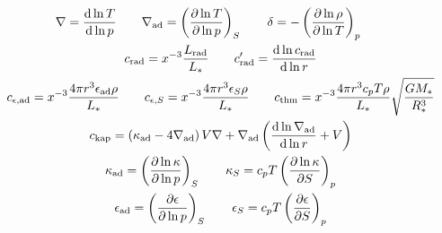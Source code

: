 \documentclass[fleqn]{article}
\newcommand{\diff}{\ensuremath{\mathrm{d}}}
\newcommand{\nabad}{\ensuremath{\nabla_{\rm ad}}}
\newcommand{\kapad}{\ensuremath{\kappa_{\rm ad}}}
\newcommand{\kapS}{\ensuremath{\kappa_{S}}}
\newcommand{\epsad}{\ensuremath{\epsilon_{\rm ad}}}
\newcommand{\epsS}{\ensuremath{\epsilon_{S}}}
\newcommand{\crad}{\ensuremath{c_{\rm rad}}}
\newcommand{\cepsad}{\ensuremath{c_{\epsilon,{\rm ad}}}}
\newcommand{\cepsS}{\ensuremath{c_{\epsilon,S}}}
\newcommand{\cthm}{\ensuremath{c_{\rm thm}}}
\newcommand{\ckap}{\ensuremath{c_{\rm kap}}}
\newcommand{\Rstar}{\ensuremath{R_{\ast}}}
\newcommand{\Mstar}{\ensuremath{M_{\ast}}}
\newcommand{\Lrad}{\ensuremath{L_{\rm rad}}}
\newcommand{\Lstar}{\ensuremath{L_{\ast}}}
\begin{document}
\begin{gather*}
\nabla = \frac{\diff \ln T}{\diff \ln p} \qquad
\nabad = \left( \frac{\partial \ln T}{\partial \ln p} \right)_{S} \qquad
\delta = - \left( \frac{\partial \ln \rho}{\partial \ln T} \right)_{p} \qquad \\
\crad = x^{-3} \frac{\Lrad}{\Lstar} \qquad
\crad' = \frac{\diff \ln \crad}{\diff \ln r} \\
\cepsad = x^{-3} \frac{4\pi r^{3} \epsad \rho}{\Lstar} \qquad
\cepsS = x^{-3} \frac{4\pi r^{3} \epsS \rho}{\Lstar} \qquad
\cthm = x^{-3} \frac{4\pi r^{3} c_{p} T \rho}{\Lstar} \sqrt{\frac{G\Mstar}{\Rstar^{3}}} \\
\ckap = \left( \kapad - 4 \nabad \right) V \nabla + \nabad \left( \frac{\diff \ln \nabad}{\diff \ln r} + V \right) \\
\kapad = \left( \frac{\partial \ln \kappa}{\partial \ln p} \right)_{S} \qquad
\kapS = c_{p} T \left( \frac{\partial \ln \kappa}{\partial S} \right)_{p} \\
\epsad = \left( \frac{\partial \epsilon}{\partial \ln p} \right)_{S} \qquad
\epsS = c_{p} T \left( \frac{\partial \epsilon}{\partial S} \right)_{p}
\end{gather*}
\end{document}
